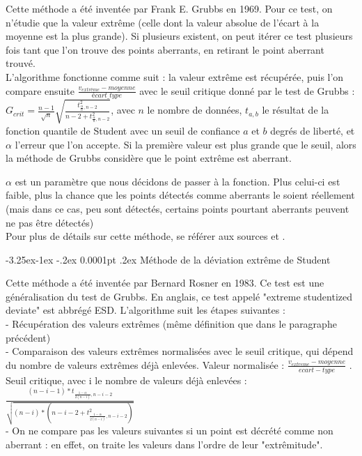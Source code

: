 \documentclass[a4paper,12pt]{article} %
\makeatletter
\renewcommand\paragraph{\@startsection{paragraph}{4}{\z@}%
                                      {-3.25ex\@plus -1ex \@minus -.2ex}%
                                      {0.0001pt \@plus .2ex}%
                                      {\normalfont\normalsize\bfseries}}
\makeatother
\begin{document}
                        Cette méthode a été inventée par Frank E. Grubbs en 1969. Pour ce test, on n’étudie que la valeur extrême (celle dont la valeur absolue de l’écart à la moyenne est la plus grande). Si plusieurs existent, on peut itérer ce test plusieurs fois tant que l'on trouve des points aberrants, en retirant le point aberrant trouvé. \\
                        
                        L'algorithme fonctionne comme suit : la valeur extrême est récupérée, puis l'on compare ensuite $\frac{v_{extrême}-moyenne}{écart\_type}$ avec le seuil critique donné par le test de Grubbs : $G_{crit} = \frac{n-1}{\sqrt{n}}\sqrt{\frac{t^2_{\frac{\alpha}{n},n-2}}{n-2+t^2_{\frac{\alpha}{n},n-2}}}$, avec $n$ le nombre de données, $t_{a,b}$ le résultat de la fonction quantile de Student avec un seuil de conﬁance $a$ et $b$ degrés de liberté, et $\alpha$ l’erreur que l’on accepte. Si la première valeur est plus grande que le seuil, alors la méthode de Grubbs considère que le point extrême est aberrant.
                        
                        $\alpha$ est un paramètre que nous décidons de passer à la fonction. Plus celui-ci est faible, plus la chance que les points détectés comme aberrants le soient réellement (mais dans ce cas, peu sont détectés, certains points pourtant aberrants peuvent ne pas être détectés)\\
                        
                        Pour plus de détails sur cette méthode, se référer aux sources \cite{Grubbs1} et \cite{Grubbs2}.


					\paragraph{Méthode de la déviation extrême de Student}
					
                        Cette méthode a été inventée par Bernard Rosner en 1983. Ce test est une généralisation du test de Grubbs. En anglais, ce test appelé "extreme studentized deviate" est abbrégé ESD. L’algorithme suit les étapes suivantes : \\
                        - Récupération des valeurs extrêmes (même déﬁnition que dans le paragraphe précédent)\\
                        - Comparaison des valeurs extrêmes normalisées avec le seuil critique, qui dépend du nombre de valeurs extrêmes déjà enlevées. Valeur normalisée : $\frac{v_{extreme}-moyenne}{ecart-type}$ . Seuil critique, avec i le nombre de valeurs déjà enlevées : 
                        $\frac{    (n-i-1)*t _{     \frac{1-\alpha}{2(n-i)},n-i-2     }       }  {        \sqrt{       (n-i)*(n-i-2+t^2_{   \frac{1-\alpha}{2(n-i)},n-i-2} )      }     }  $ \\
                         - On ne compare pas les valeurs suivantes si un point est décrété comme non aberrant : en eﬀet, on traite les valeurs dans l’ordre de leur "extrêmitude".\\
                         
\end{document}
